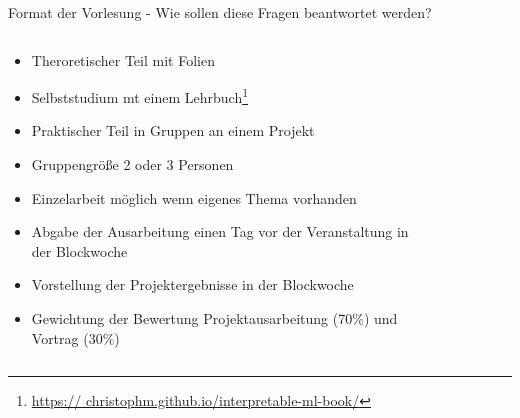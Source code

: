 \documentclass[aspectratio=1610, xcolor=dvipsnames, 9pt]{beamer}
\begin{document}
\begin{frame}{Format der Vorlesung - Wie sollen diese Fragen beantwortet werden?}
  \begin{columns}
    \begin{column}{0.69\textwidth}
      \begin{itemize}
        \item Theroretischer Teil mit Folien \newline
        \item Selbststudium mt einem Lehrbuch\footnote{\url{https:// christophm.github.io/interpretable-ml-book/}} \cite{molnar2025} \newline
        \item Praktischer Teil in Gruppen an einem Projekt  \newline
        \item Gruppengröße 2 oder 3 Personen  \newline
        \item Einzelarbeit möglich wenn eigenes Thema vorhanden \newline
        \item Abgabe der Ausarbeitung einen Tag vor der Veranstaltung in der Blockwoche \newline
        \item Vorstellung der Projektergebnisse in der Blockwoche \newline
        \item Gewichtung der Bewertung Projektausarbeitung (70\%) und Vortrag (30\%)
      \end{itemize}
    \end{column}
    \begin{column}{0.3\textwidth}
 \begin{figure}
 \centering

\end{figure}
\end{column}
\end{columns}
\end{frame}
\end{document}
